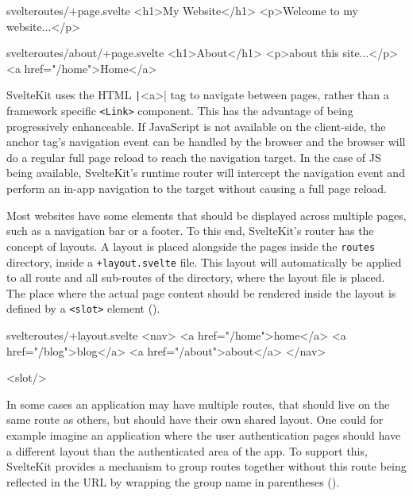\begin{listing}[h!]
\begin{myminted}{svelte}{routes/+page.svelte}
<h1>My Website</h1>
<p>Welcome to my website...</p>
\end{myminted}
\begin{myminted}{svelte}{routes/about/+page.svelte}
<h1>About</h1>
<p>about this site...</p>
<a href="/home">Home</a>
\end{myminted}
\caption{Example page-definitions in SvelteKit.}
\label{fig:sveltekit-page-file}
\end{listing}

SvelteKit uses the HTML \texttt|<a>| tag to navigate between pages, rather than a framework specific \texttt{<Link>} component. This has the advantage of being progressively enhanceable. If JavaScript is not available on the client-side, the anchor tag's navigation event can be handled by the browser and the browser will do a regular full page reload to reach the navigation target. In the case of JS being available, SvelteKit's runtime router will intercept the navigation event and perform an in-app navigation to the target without causing a full page reload.

Most websites have some elements that should be displayed across multiple pages, such as a navigation bar or a footer. To this end, SvelteKit's router has the concept of layouts. A layout is placed alongside the pages inside the \texttt{routes} directory, inside a \texttt{+layout.svelte} file. This layout will automatically be applied to all route and all sub-routes of the directory, where the layout file is placed. The place where the actual page content should be rendered inside the layout is defined by a \texttt{<slot>} element ().

\begin{listing}[h!]
\begin{myminted}{svelte}{routes/+layout.svelte}
<nav>
  <a href="/home">home</a>
  <a href="/blog">blog</a>
  <a href="/about">about</a>
</nav>

<slot/>
\end{myminted}
\caption{Example for a layout that provides a navigation bar.}
\label{fig:sveltekit-layout}
\end{listing}

In some cases an application may have multiple routes, that should live on the same route as others, but should have their own shared layout. One could for example imagine an application where the user authentication pages should have a different layout than the authenticated area of the app. To support this, SvelteKit provides a mechanism to group routes together without this route being reflected in the URL by wrapping the group name in parentheses ().

